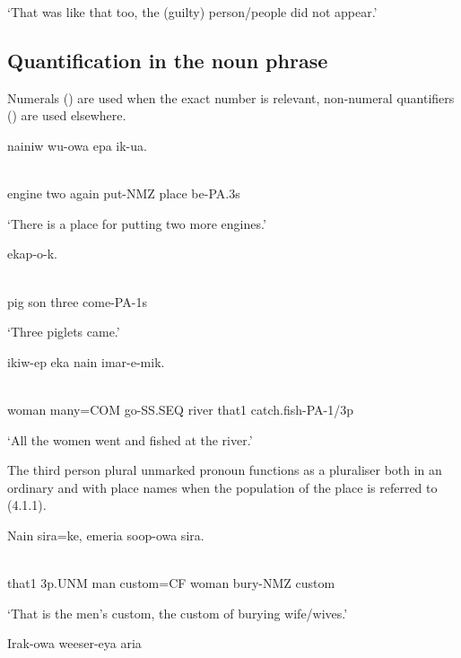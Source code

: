 `That was like that too, the (guilty) person/people did not appear.'

\subsection{Quantification in the noun phrase}
\hypertarget{RefHeading22581935131865}{}
Numerals () are used when the exact number is relevant, non-numeral quantifiers () are used elsewhere.  

\ea%
\label{ex:x1286}
\gll {}  nainiw  wu-owa  epa  ik-ua. \\
      \\
\glt
\z

engine  two  again  put-NMZ  place  be-PA.3s

`There is a place for putting two more engines.'

\ea%
\label{ex:x1308}
\gll {}    ekap-o-k. \\
      \\
\glt
\z

pig  son  three  come-PA-1s

`Three piglets came.'

\ea%
\label{ex:x1287}
\gll {}    ikiw-ep  eka  nain  imar-e-mik. \\
      \\
\glt
\z

woman  many=COM  go-SS.SEQ  river  that1  catch.fish-PA-1/3p

`All the women went and fished at the river.'

The third person plural unmarked pronoun functions as a pluraliser both in an ordinary  and with place names when the population of the place is referred to (4.1.1). 

\ea%
\label{ex:x1288}
\gll Nain    sira=ke,  emeria  soop-owa  sira. \\
      \\
\glt
\z

that1  3p.UNM  man  custom=CF  woman  bury-NMZ  custom

`That is the men's custom, the custom of burying wife/wives.'

\ea%
\label{ex:x1289}
\gll Irak-owa  weeser-eya  aria   \\
      \\
\glt
\z

